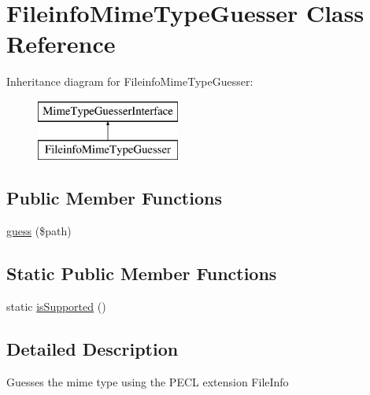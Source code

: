 \hypertarget{class_symfony_1_1_component_1_1_http_foundation_1_1_file_1_1_mime_type_1_1_fileinfo_mime_type_guesser}{
\section{\-Fileinfo\-Mime\-Type\-Guesser \-Class \-Reference}
\label{class_symfony_1_1_component_1_1_http_foundation_1_1_file_1_1_mime_type_1_1_fileinfo_mime_type_guesser}
}
\-Inheritance diagram for \-Fileinfo\-Mime\-Type\-Guesser\-:\begin{figure}[H]
\begin{center}
\leavevmode
\includegraphics[height=2.000000cm]{class_symfony_1_1_component_1_1_http_foundation_1_1_file_1_1_mime_type_1_1_fileinfo_mime_type_guesser}
\end{center}
\end{figure}
\subsection*{\-Public \-Member \-Functions}
\begin{DoxyCompactItemize}
\item 
\hyperlink{class_symfony_1_1_component_1_1_http_foundation_1_1_file_1_1_mime_type_1_1_fileinfo_mime_type_guesser_af42fcbb87eebfa7fa5e31c9c42af0c1a}{guess} (\$path)
\end{DoxyCompactItemize}
\subsection*{\-Static \-Public \-Member \-Functions}
\begin{DoxyCompactItemize}
\item 
static \hyperlink{class_symfony_1_1_component_1_1_http_foundation_1_1_file_1_1_mime_type_1_1_fileinfo_mime_type_guesser_adc36dedf4b7b9d79eed5296b94001311}{is\-Supported} ()
\end{DoxyCompactItemize}


\subsection{\-Detailed \-Description}
\-Guesses the mime type using the \-P\-E\-C\-L extension \-File\-Info

